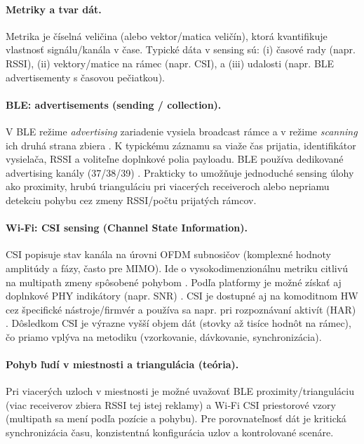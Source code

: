 \paragraph{Metriky a tvar dát.}
Metrika je číselná veličina (alebo vektor/matica veličín), ktorá kvantifikuje vlastnosť signálu/kanála v čase.
Typické dáta v sensing sú: (i) časové rady (napr. RSSI), (ii) vektory/matice na rámec (napr. CSI), a (iii) udalosti
(napr. BLE advertisementy s časovou pečiatkou).

\paragraph{BLE: advertisements (sending / collection).}
V BLE režime \textit{advertising} zariadenie vysiela broadcast rámce a v režime \textit{scanning} ich druhá strana zbiera
\cite{bluetooth_core_ll}. K typickému záznamu sa viaže čas prijatia, identifikátor vysielača, RSSI a voliteľne doplnkové polia payloadu.
BLE používa dedikované advertising kanály (37/38/39) \cite{ble_channels_mathworks}. Prakticky to umožňuje jednoduché sensing úlohy ako proximity,
hrubú trianguláciu pri viacerých receiveroch alebo nepriamu detekciu pohybu cez zmeny RSSI/počtu prijatých rámcov.

\paragraph{Wi‑Fi: CSI sensing (Channel State Information).}
CSI popisuje stav kanála na úrovni OFDM subnosičov (komplexné hodnoty amplitúdy a fázy, často pre MIMO).
Ide o vysokodimenzionálnu metriku citlivú na multipath zmeny spôsobené pohybom \cite{ma2019wifisense_survey}.
Podľa platformy je možné získať aj doplnkové PHY indikátory (napr. SNR) \cite{espressif_esp_csi_doc}.
CSI je dostupné aj na komoditnom HW cez špecifické nástroje/firmvér \cite{nexmon_csi_repo,gringoli2019_free_your_csi}
a používa sa napr. pri rozpoznávaní aktivít (HAR) \cite{zhuravchak2022_wifi_csi_har}.
Dôsledkom CSI je výrazne vyšší objem dát (stovky až tisíce hodnôt na rámec), čo priamo vplýva na metodiku (vzorkovanie, dávkovanie, synchronizácia).

\paragraph{Pohyb ľudí v miestnosti a triangulácia (teória).}
Pri viacerých uzloch v miestnosti je možné uvažovať BLE proximity/trianguláciu (viac receiverov zbiera RSSI tej istej reklamy)
a Wi‑Fi CSI priestorové vzory (multipath sa mení podľa pozície a pohybu). Pre porovnateľnosť dát je kritická synchronizácia času,
konzistentná konfigurácia uzlov a kontrolované scenáre.

